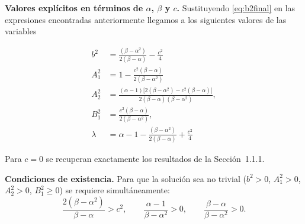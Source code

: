 \documentclass[letterpaper,11pt]{exam}
\theoremstyle{plain}
\begin{document}
\medskip
\noindent\textbf{Valores explícitos en términos de $\alpha$, $\beta$ y $c$.}
Sustituyendo \eqref{eq:b2final} en las expresiones encontradas anteriormente llegamos a los siguientes valores de las variables
 
\begin{align}
    b^2     &= \frac{(\beta-\alpha^2)}{2(\beta-\alpha)}-\frac{c^2}{4}
    \label{eq:bfinal}\\[8pt]
    A_1^2   &= 1-\frac{c^2(\beta-\alpha)}{2(\beta-\alpha^2)}
    \label{eq:A1final}\\[8pt]
    A_2^2   &= \frac{(\alpha-1)\bigl[2(\beta-\alpha^2)-c^2(\beta-\alpha)\bigr]}
                    {2(\beta-\alpha)(\beta-\alpha^2)},
    \label{eq:A2final}\\[8pt]
    B_1^2   &= \frac{c^2(\beta-\alpha)}{2(\beta-\alpha^2)},
    \label{eq:B1final}\\[8pt]
    \lambda &= \alpha - 1 -\frac{(\beta-\alpha^2)}{2(\beta-\alpha)}+\frac{c^2}{4}    
    \label{eq:lambdafinal}
\end{align}
 
\noindent Para $c=0$ se recuperan exactamente los resultados de la Sección~1.1.1.
 
\medskip
\noindent\textbf{Condiciones de existencia.}
Para que la solución sea no trivial ($b^2>0$, $A_1^2>0$, $A_2^2>0$, $B_1^2\geq 0$)
se requiere simultáneamente:
\begin{equation}
    \frac{2(\beta-\alpha^2)}{\beta-\alpha} > c^2, \qquad
    \frac{\alpha-1}{\beta-\alpha^2}>0, \qquad
    \frac{\beta-\alpha}{\beta-\alpha^2}>0.
\end{equation}
\end{document}
